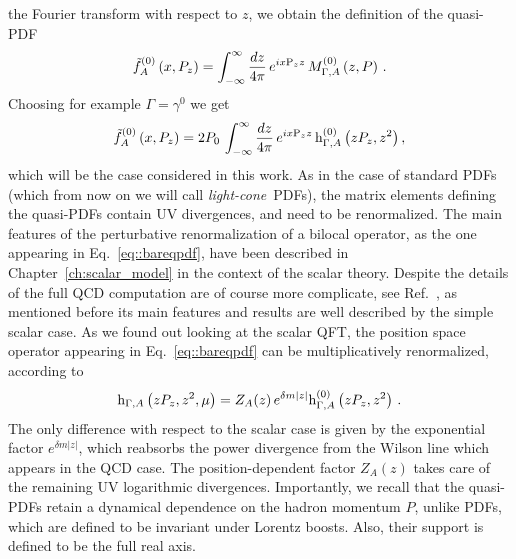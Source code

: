 the Fourier transform with respect to $z$, we obtain the definition of the
quasi-PDF  
\begin{align}
	\label{eq::bareqpdf}                                                 
	\tilde{f}_A^{(0)}\left( x, P_z\right) = 
	\int_{-\infty}^{\infty}\frac{dz}{4\pi}\,e^{i x \text{P}_z z}\,M^{(0)}_{\Gamma,A}\left(z,P\right)\, .
\end{align}
Choosing for example $\Gamma = \gamma^0$ we get
\begin{align}
	\label{eq::bareqpdf}                                                 
	\tilde{f}_A^{(0)}\left( x, P_z\right) = 
	2 P_0 \, \int_{-\infty}^{\infty}\frac{dz}{4\pi}\,e^{i x \text{P}_z z}\,\text{h}^{(0)}_{\Gamma,A}\left( z P_z,z^2 \right), 
\end{align}
which will be the case considered in this work. As in the case of standard PDFs
(which from now on we will call {\em light-cone}\ PDFs), the matrix elements
defining the quasi-PDFs contain UV divergences, and need to be renormalized. The
main features of the perturbative renormalization of a bilocal operator, 
as the one appearing in
Eq.~\eqref{eq::bareqpdf}, have been described in Chapter~\ref{ch:scalar_model}
in the context of the scalar theory.
Despite the details of the full QCD computation are of course more complicate,
see Ref.~\cite{Ishikawa:2017faj}, as mentioned before 
its main features and results are well described by the simple scalar case.
As we found out looking at the scalar QFT,
the position space operator appearing in Eq.~\eqref{eq::bareqpdf} can be multiplicatively
renormalized, according to
\begin{align}
    \text{h}_{\Gamma,A}\left( z P_z,z^2,\mu \right) = Z_{A}(z)\,
    e^{\delta m |z|} \text{h}^{(0)}_{\Gamma,A}\left( z P_z,z^2 \right)\,.
\end{align}
The only difference with respect to the scalar case is given by
the exponential factor $e^{\delta m |z|}$, which reabsorbs the power divergence
from the Wilson line which appears in the QCD case. The position-dependent factor $Z_{A}(z)$ takes care of
the remaining UV logarithmic divergences.  
%
Importantly, we recall that the quasi-PDFs retain a dynamical dependence on the hadron momentum
$P$, unlike PDFs, which are defined to be invariant under Lorentz boosts. Also,
their support is defined to be the full real axis.

